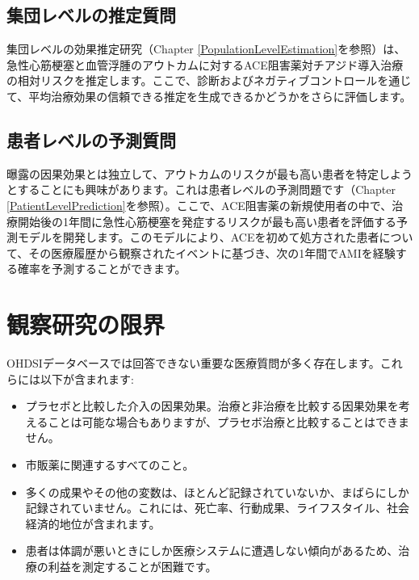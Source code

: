 \documentclass[
  11pt]{book}
\providecommand{\tightlist}{%
  \setlength{\itemsep}{0pt}\setlength{\parskip}{0pt}}
\theoremstyle{definition}
\theoremstyle{definition}
\theoremstyle{definition}
\theoremstyle{definition}
\theoremstyle{remark}
\begin{document}
\subsection{集団レベルの推定質問}\label{ux96c6ux56e3ux30ecux30d9ux30ebux306eux63a8ux5b9aux8ceaux554f}

集団レベルの効果推定研究（Chapter \ref{PopulationLevelEstimation}を参照）は、急性心筋梗塞と血管浮腫のアウトカムに対するACE阻害薬対チアジド導入治療の相対リスクを推定します。ここで、診断およびネガティブコントロールを通じて、平均治療効果の信頼できる推定を生成できるかどうかをさらに評価します。

\subsection{患者レベルの予測質問}\label{ux60a3ux8005ux30ecux30d9ux30ebux306eux4e88ux6e2cux8ceaux554f}

曝露の因果効果とは独立して、アウトカムのリスクが最も高い患者を特定しようとすることにも興味があります。これは患者レベルの予測問題です（Chapter \ref{PatientLevelPrediction}を参照）。ここで、ACE阻害薬の新規使用者の中で、治療開始後の1年間に急性心筋梗塞を発症するリスクが最も高い患者を評価する予測モデルを開発します。このモデルにより、ACEを初めて処方された患者について、その医療履歴から観察されたイベントに基づき、次の1年間でAMIを経験する確率を予測することができます。

\section{観察研究の限界}\label{ux89b3ux5bdfux7814ux7a76ux306eux9650ux754c}


OHDSIデータベースでは回答できない重要な医療質問が多く存在します。これらには以下が含まれます:

\begin{itemize}
\tightlist
\item
  プラセボと比較した介入の因果効果。治療と非治療を比較する因果効果を考えることは可能な場合もありますが、プラセボ治療と比較することはできません。
\item
  市販薬に関連するすべてのこと。
\item
  多くの成果やその他の変数は、ほとんど記録されていないか、まばらにしか記録されていません。これには、死亡率、行動成果、ライフスタイル、社会経済的地位が含まれます。
\item
  患者は体調が悪いときにしか医療システムに遭遇しない傾向があるため、治療の利益を測定することが困難です。
\end{itemize}
\end{document}
